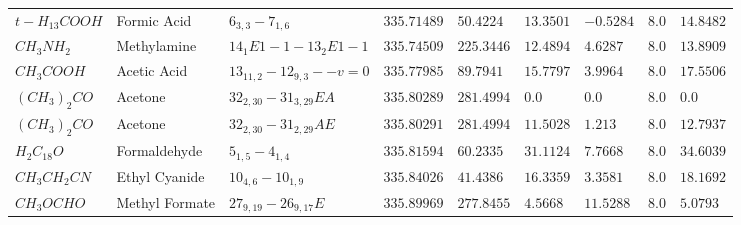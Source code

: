 \documentclass[10pt]{article}
\begin{document}
\begin{table}[htb]
\begin{tabular}{l l l l l l l l l}
$t-H_{13}COOH$ & Formic Acid & $6_{3,3}-7_{1,6}$ & $335.71489$ & $50.4224$ & $13.3501$ & $-0.5284$ & $8.0$ & $14.8482$\\
$CH_{3}NH_{2}$ & Methylamine & $14_{1}E1-1-13_{2}E1-1$ & $335.74509$ & $225.3446$ & $12.4894$ & $4.6287$ & $8.0$ & $13.8909$\\
$CH_{3}COOH$ & Acetic Acid & $13_{11,2}-12_{9,3}--v=0$ & $335.77985$ & $89.7941$ & $15.7797$ & $3.9964$ & $8.0$ & $17.5506$\\
$(CH_{3})_{2}CO$ & Acetone & $32_{2,30}-31_{3,29}EA$ & $335.80289$ & $281.4994$ & $0.0$ & $0.0$ & $8.0$ & $0.0$\\
$(CH_{3})_{2}CO$ & Acetone & $32_{2,30}-31_{2,29}AE$ & $335.80291$ & $281.4994$ & $11.5028$ & $1.213$ & $8.0$ & $12.7937$\\
$H_{2}C_{18}O$ & Formaldehyde & $5_{1,5}-4_{1,4}$ & $335.81594$ & $60.2335$ & $31.1124$ & $7.7668$ & $8.0$ & $34.6039$\\
$CH_{3}CH_{2}CN$ & Ethyl Cyanide & $10_{4,6}-10_{1,9}$ & $335.84026$ & $41.4386$ & $16.3359$ & $3.3581$ & $8.0$ & $18.1692$\\
$CH_{3}OCHO$ & Methyl Formate & $27_{9,19}-26_{9,17}E$ & $335.89969$ & $277.8455$ & $4.5668$ & $11.5288$ & $8.0$ & $5.0793$\\
    \hline                  
    \end{tabular}
\end{table}
\end{document}
